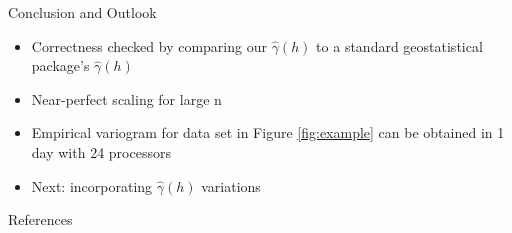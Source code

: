 \documentclass[serif,mathserif,final]{beamer}
\begin{document}
\begin{frame}{}
\begin{columns}[t]
\begin{column}{0.32\linewidth}
      \begin{block}{Conclusion and Outlook}
        \begin{itemize}
         \item Correctness checked by comparing our $\hat{\gamma}(h)$ to a standard geostatistical package's $\hat{\gamma}(h)$
         \item Near-perfect scaling for large n
         \item Empirical variogram for data set in Figure \ref{fig:example} can be obtained in 1 day with 24 processors
         \item Next: incorporating $\hat{\gamma}(h)$ variations
        \end{itemize}
      \end{block}

      \begin{block}{References}
        
	{\footnotesize
	}
      \end{block}

    \end{column}%

  \end{columns}
\end{frame}
\end{document}
